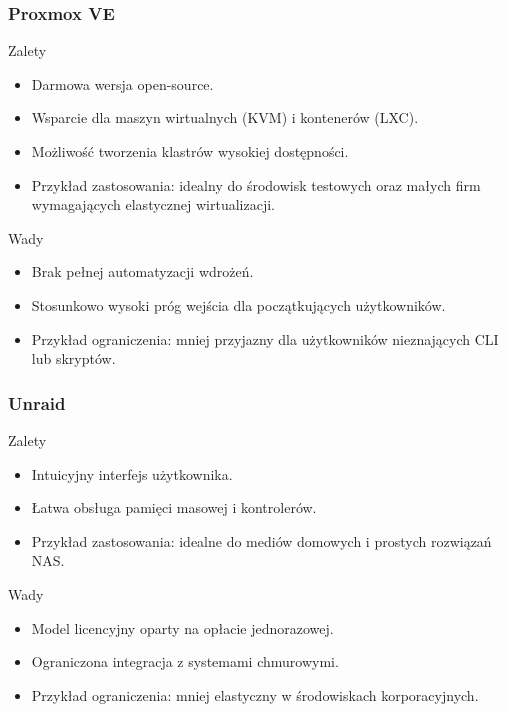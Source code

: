 \subsubsection{Proxmox VE \cite{Proxmox}}
\begin{minipage}{0.45\textwidth}
    Zalety
    \begin{itemize}
        \item Darmowa wersja open-source.
        \item Wsparcie dla maszyn wirtualnych (KVM) i kontenerów (LXC).
        \item Możliwość tworzenia klastrów wysokiej dostępności.
        \item Przykład zastosowania: idealny do środowisk testowych oraz małych firm wymagających elastycznej wirtualizacji.
    \end{itemize}
\end{minipage}\hfil
\begin{minipage}{0.45\textwidth}
    Wady
    \begin{itemize}
        \item Brak pełnej automatyzacji wdrożeń.
        \item Stosunkowo wysoki próg wejścia dla początkujących użytkowników.
        \item Przykład ograniczenia: mniej przyjazny dla użytkowników nieznających CLI lub skryptów.
    \end{itemize}
\end{minipage}

\subsubsection{Unraid \cite{Unraid}}
\begin{minipage}{0.45\textwidth}
    Zalety
    \begin{itemize}
        \item Intuicyjny interfejs użytkownika.
        \item Łatwa obsługa pamięci masowej i kontrolerów.
        \item Przykład zastosowania: idealne do mediów domowych i prostych rozwiązań NAS.
    \end{itemize}
\end{minipage}\hfil
\begin{minipage}{0.45\textwidth}
    Wady
    \begin{itemize}
        \item Model licencyjny oparty na opłacie jednorazowej.
        \item Ograniczona integracja z systemami chmurowymi.
        \item Przykład ograniczenia: mniej elastyczny w środowiskach korporacyjnych.
    \end{itemize}
\end{minipage}

